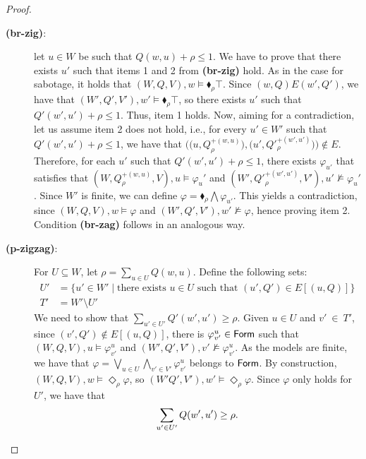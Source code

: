 \begin{proof}
\begin{description}
    \item[\textbf{(br-zig)}:] let $u \in W$ be such that ${Q}(w,u) + \rho \leq 1 $. We have to prove that there exists $u'$ such that items 1 and 2 from \textbf{(br-zig)} hold. As in the case for sabotage, it holds that $(W,{Q},V) , w \models \blacklozenge_{\rho} \top $. Since $(w,{Q})E(w',{Q}')$, we have that $(W',{Q}',V') , w' \models \blacklozenge_{\rho} \top $, so there exists $u'$ such that ${Q}'(w',u') + \rho \leq 1$. Thus, item 1 holds. Now, aiming for a contradiction, let us assume item 2 does not hold, i.e., for every $u'\in W'$ such that ${Q}'(w',u') + \rho \leq 1$, we have that $\big ( \big ( u, {Q}_{\rho}^{+(w,u)} \big ), \big ( u',{Q}'^{+(w',u')}_{\rho}\big )\big ) \notin E$. Therefore, for each $u'$ such that ${Q}'(w',u') + \rho \leq 1 $, there exists $\varphi_{u'}$ that satisfies that $(W,{Q}_{\rho}^{+(w,u)},V) , u \models \varphi_u'$ and $(W',{Q'}_{\rho}^{+(w',u')},V') , u' \not \models \varphi_u'$. Since $W'$ is finite, we can define $\varphi = \blacklozenge_\rho \bigwedge \varphi_{u'}$. This yields a contradiction, since $(W,{Q},V) , w \models \varphi$ and $(W',{Q}',V') , w' \not \models \varphi$, hence proving item 2. Condition \textbf{(br-zag)} follows in an analogous way.
    
    \item[\textbf{(p-zigzag)}:] For $U \subseteq W$, let $\rho = \sum_{u \in U} {Q}(w,u)$. Define the following sets:
        \begin{align*}
            U' &= \{ u' \in W' \mid \text{there exists } u\in U \text{ such that } (u',{Q}')\in E[(u,{Q})] \} \\
            T' &= W' \setminus U' 
        \end{align*}
    We need to show that $\sum_{u'\in U'} {Q}'(w',u') \geq \rho$. Given $u\in U$ and $v'~\in~T'$, since $(v', {Q}') \notin E[(u,{Q})]$, there is $\varphi_{v'}^{u}\in\mathsf{Form} $ such that $(W,{Q},V) , u \models \varphi_{v'}^{u}$ and $(W',{Q}',V') , v' \not\models \varphi_{v'}^{u}$. As the models are finite, we have that $\varphi = \bigvee_{u\in U} \bigwedge_{v'\in V'} \varphi_{v'}^{u} $ belongs to $\mathsf{Form}$.
    By construction, $(W,{Q},V) , w \models \Diamond_\rho \varphi$, so $(W'{Q}',V') , w' \models \Diamond_\rho \varphi$. Since $\varphi$ only holds for $U'$, we have that
    \[
        \sum_{u'\in U'}{Q}(w',u')\geq \rho. \qedhere
    \]
\end{description}
\end{proof}


